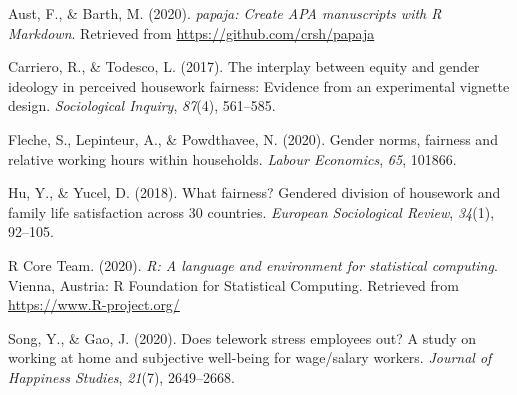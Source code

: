 \documentclass[
  english,
  man]{apa6}
\newlength{\cslhangindent}
\newenvironment{cslreferences}%
  {\setlength{\parindent}{0pt}%
  \everypar{\setlength{\hangindent}{\cslhangindent}}\ignorespaces}%
  {\par}
\begin{document}
\hypertarget{refs}{}
\begin{cslreferences}
\leavevmode\hypertarget{ref-R-papaja}{}%
Aust, F., \& Barth, M. (2020). \emph{papaja: Create APA manuscripts with R Markdown}. Retrieved from \url{https://github.com/crsh/papaja}

\leavevmode\hypertarget{ref-carriero2017interplay}{}%
Carriero, R., \& Todesco, L. (2017). The interplay between equity and gender ideology in perceived housework fairness: Evidence from an experimental vignette design. \emph{Sociological Inquiry}, \emph{87}(4), 561--585.

\leavevmode\hypertarget{ref-fleche2020gender}{}%
Fleche, S., Lepinteur, A., \& Powdthavee, N. (2020). Gender norms, fairness and relative working hours within households. \emph{Labour Economics}, \emph{65}, 101866.

\leavevmode\hypertarget{ref-hu2018fairness}{}%
Hu, Y., \& Yucel, D. (2018). What fairness? Gendered division of housework and family life satisfaction across 30 countries. \emph{European Sociological Review}, \emph{34}(1), 92--105.

\leavevmode\hypertarget{ref-R-base}{}%
R Core Team. (2020). \emph{R: A language and environment for statistical computing}. Vienna, Austria: R Foundation for Statistical Computing. Retrieved from \url{https://www.R-project.org/}

\leavevmode\hypertarget{ref-song2020does}{}%
Song, Y., \& Gao, J. (2020). Does telework stress employees out? A study on working at home and subjective well-being for wage/salary workers. \emph{Journal of Happiness Studies}, \emph{21}(7), 2649--2668.
\end{cslreferences}

\endgroup
\end{document}
